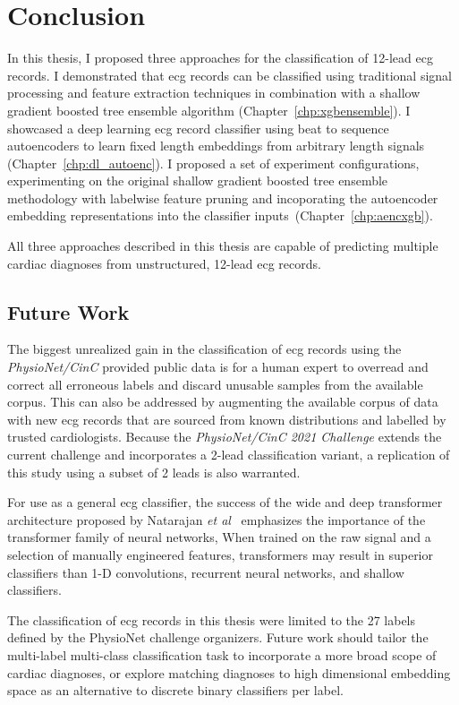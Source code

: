 \documentclass[\main/thesis.tex]{subfiles}
\begin{document}
\chapter{Conclusion}
\label{chp:conclusion}

In this thesis, I proposed three approaches for the classification of 12-lead \gls{ecg} records.
I demonstrated that \gls{ecg} records can be classified using traditional signal processing and feature extraction techniques in combination with a shallow gradient boosted tree ensemble algorithm (Chapter~\ref{chp:xgbensemble}).
I showcased a deep learning \gls{ecg} record classifier using beat to sequence autoencoders to learn fixed length embeddings from arbitrary length signals (Chapter~\ref{chp:dl_autoenc}).
I proposed a set of experiment configurations, experimenting on the original shallow gradient boosted tree ensemble methodology with labelwise feature pruning and incoporating the autoencoder embedding representations into the classifier inputs~(Chapter~\ref{chp:aencxgb}).

All three approaches described in this thesis are capable of predicting multiple cardiac diagnoses from unstructured, 12-lead \gls{ecg} records.

\section{Future Work}
The biggest unrealized gain in the classification of \gls{ecg} records using the \emph{PhysioNet/CinC} provided public data is for a human expert to overread and correct all erroneous labels and discard unusable samples from the available corpus.
This can also be addressed by augmenting the available corpus of data with new \gls{ecg} records that are sourced from known distributions and labelled by trusted cardiologists.
Because the \emph{PhysioNet/CinC 2021 Challenge} extends the current challenge and incorporates a 2-lead classification variant, a replication of this study using a subset of 2 leads is also warranted.

For use as a general \gls{ecg} classifier, the success of the wide and deep transformer architecture proposed by Natarajan \emph{et al}~\cite{natarajan2020CINC-multilabel-ECG} emphasizes the importance of the transformer family of neural networks,
When trained on the raw signal and a selection of manually engineered features, transformers may result in superior classifiers than 1-D convolutions, recurrent neural networks, and shallow classifiers.

The classification of \gls{ecg} records in this thesis were limited to the 27 labels defined by the PhysioNet challenge organizers.
Future work should tailor the multi-label multi-class classification task to incorporate a more broad scope of cardiac diagnoses, or explore matching diagnoses to high dimensional embedding space as an alternative to discrete binary classifiers per label.
\end{document}
